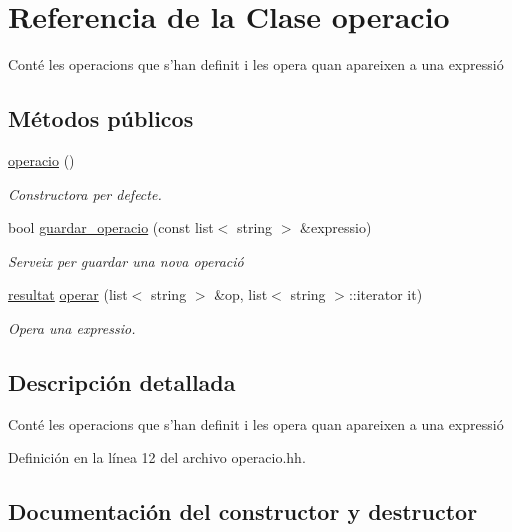 \hypertarget{classoperacio}{}\section{Referencia de la Clase operacio}
\label{classoperacio}


Conté les operacions que s’han definit i les opera quan apareixen a una expressió  


\subsection*{Métodos públicos}
\begin{DoxyCompactItemize}
\item 
\hyperlink{classoperacio_aa16956dfb69552de3ff43261de600bbe}{operacio} ()
\begin{DoxyCompactList}\small\item\em Constructora per defecte. \end{DoxyCompactList}\item 
bool \hyperlink{classoperacio_aa1f42a80cc416ff33caea9898fe3c9b9}{guardar\+\_\+operacio} (const list$<$ string $>$ \&expressio)
\begin{DoxyCompactList}\small\item\em Serveix per guardar una nova operació \end{DoxyCompactList}\item 
\hyperlink{classresultat}{resultat} \hyperlink{classoperacio_ab64cf3a9e19efd65c2ea3fe276cfabaf}{operar} (list$<$ string $>$ \&op, list$<$ string $>$\+::iterator it)
\begin{DoxyCompactList}\small\item\em Opera una expressio. \end{DoxyCompactList}\end{DoxyCompactItemize}


\subsection{Descripción detallada}
Conté les operacions que s’han definit i les opera quan apareixen a una expressió 

Definición en la línea 12 del archivo operacio.\+hh.



\subsection{Documentación del constructor y destructor}
\hypertarget{classoperacio_aa16956dfb69552de3ff43261de600bbe}{}\label{classoperacio_aa16956dfb69552de3ff43261de600bbe} 
